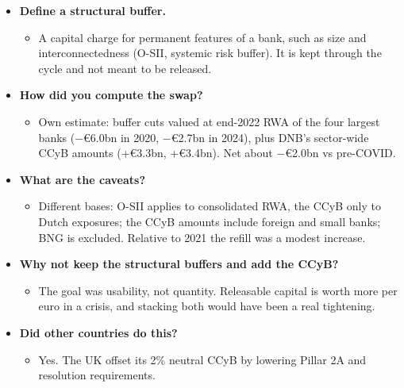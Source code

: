 \documentclass[10pt]{article}
\begin{document}
\begin{tcolorbox}[sbox,width=0.495\linewidth,height=14.6cm,nobeforeafter,box align=top,fit basedim=11pt,colframe=nlred!70,colbacktitle=nlred!8,coltitle=nlred,title=LIKELY CHALLENGES · definitions and logic]
\begin{itemize}
\item[\textcolor{navy}{\textbf{Q}}] \textbf{Define a structural buffer.}
\begin{itemize}
\item A capital charge for permanent features of a bank, such as size and interconnectedness (O-SII, systemic risk buffer). It is kept through the cycle and not meant to be released.
\end{itemize}
\item[\textcolor{navy}{\textbf{Q}}] \textbf{How did you compute the swap?}
\begin{itemize}
\item Own estimate: buffer cuts valued at end-2022 RWA of the four largest banks (−€6.0bn in 2020, −€2.7bn in 2024), plus DNB's sector-wide CCyB amounts (+€3.3bn, +€3.4bn). Net about −€2.0bn vs pre-COVID.
\end{itemize}
\item[\textcolor{navy}{\textbf{Q}}] \textbf{What are the caveats?}
\begin{itemize}
\item Different bases: O-SII applies to consolidated RWA, the CCyB only to Dutch exposures; the CCyB amounts include foreign and small banks; BNG is excluded. Relative to 2021 the refill was a modest increase.
\end{itemize}
\item[\textcolor{navy}{\textbf{Q}}] \textbf{Why not keep the structural buffers and add the CCyB?}
\begin{itemize}
\item The goal was usability, not quantity. Releasable capital is worth more per euro in a crisis, and stacking both would have been a real tightening.
\end{itemize}
\item[\textcolor{navy}{\textbf{Q}}] \textbf{Did other countries do this?}
\begin{itemize}
\item Yes. The UK offset its 2\% neutral CCyB by lowering Pillar 2A and resolution requirements.
\end{itemize}
\end{itemize}
\end{tcolorbox}
\newpage
\end{document}
